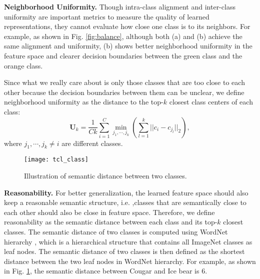 \textbf{Neighborhood Uniformity.} Though intra-class alignment and inter-class  uniformity are important metrics to measure the quality of learned representations, they cannot evaluate how close one class is to its neighbors. For example, as shown in Fig. \ref{fig:balance}, although both (a) and (b) achieve the same alignment and uniformity, (b) shows better neighborhood uniformity in the feature space and clearer decision boundaries between the green class and the orange class. 

Since what we really care about is only those classes that are too close to each other because the decision boundaries between them can be unclear, we define neighborhood uniformity as the distance to the top-$k$ closest class centers of each class:
\begin{equation}
    \textbf{U}_k=\frac{1}{Ck}\sum_{i=1}^C\min_{j_1,\cdots, j_k}(\sum_{l=1}^k||c_i-c_{j_l}||_2),
\end{equation}
where $j_1, \cdots, j_k \neq i$ are different classes.

\begin{figure}[h]
\begin{center}
\texttt{[image: tcl\_class]}
\end{center}
\vspace{-15pt}
\caption{Illustration of semantic distance between two classes.}
\label{fig:semantic}
\vspace{-5pt}
\end{figure}

\textbf{Reasonability.} For better generalization, the learned feature space should also keep a reasonable semantic structure, i.e. ,classes that are semantically close to each other should also be close in feature space. Therefore, we define reasonability as the semantic distance between each class and its top-$k$ closest classes. The semantic distance of two classes is computed using WordNet hierarchy \cite{miller1995wordnet}, which is a hierarchical structure that contains all ImageNet classes as leaf nodes. The semantic distance of two classes is then defined as the shortest distance between the two leaf nodes in WordNet hierarchy. For example, as shown in Fig. \ref{fig:semantic}, the semantic distance between Cougar and Ice bear is 6.

